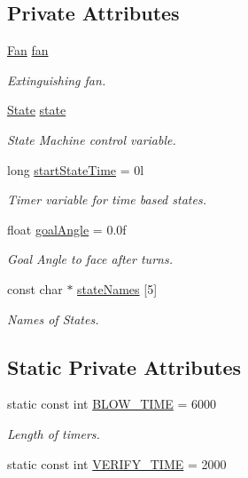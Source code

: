 \subsection*{Private Attributes}
\begin{DoxyCompactItemize}
\item 
\hyperlink{classFan}{Fan} \hyperlink{classExtinguisher_a47ec6f79ddc26b18bbc1a0ac9741ae24}{fan}
\begin{DoxyCompactList}\small\item\em Extinguishing fan. \end{DoxyCompactList}\item 
\hyperlink{classExtinguisher_a969a7cce3382fc5d67f687540896e3ab}{State} \hyperlink{classExtinguisher_aa67c13dc091e5dc2c054d53f7fcae69b}{state}
\begin{DoxyCompactList}\small\item\em State Machine control variable. \end{DoxyCompactList}\item 
long \hyperlink{classExtinguisher_a75020779b6ba6fcd9ac11148a378d441}{start\-State\-Time} = 0l
\begin{DoxyCompactList}\small\item\em Timer variable for time based states. \end{DoxyCompactList}\item 
float \hyperlink{classExtinguisher_af7b156761cc23a5bee07f3cecd50213a}{goal\-Angle} = 0.\-0f
\begin{DoxyCompactList}\small\item\em Goal Angle to face after turns. \end{DoxyCompactList}\item 
const char $\ast$ \hyperlink{classExtinguisher_a91cd54af9125620a68939ccdc5796c66}{state\-Names} \mbox{[}5\mbox{]}
\begin{DoxyCompactList}\small\item\em Names of States. \end{DoxyCompactList}\end{DoxyCompactItemize}
\subsection*{Static Private Attributes}
\begin{DoxyCompactItemize}
\item 
static const int \hyperlink{classExtinguisher_a454a63d5013db7cec4e5ae18fbfe64fa}{B\-L\-O\-W\-\_\-\-T\-I\-M\-E} = 6000
\begin{DoxyCompactList}\small\item\em Length of timers. \end{DoxyCompactList}\item 
static const int \hyperlink{classExtinguisher_a1f4f2c248d5fcf98a62eab8019ab79f9}{V\-E\-R\-I\-F\-Y\-\_\-\-T\-I\-M\-E} = 2000
\end{DoxyCompactItemize}


